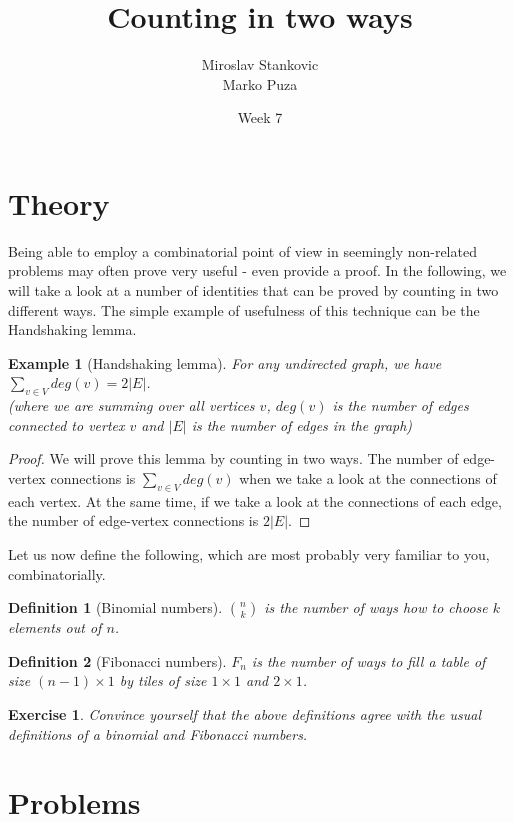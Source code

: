 \documentclass{article}
\title{\textbf{Counting in two ways}}
\date{Week 7}
\author{Miroslav Stankovic \\ Marko Puza}
\newtheorem{definition}{Definition}
\newtheorem{exercise}{Exercise}
\newtheorem{example}{Example}
\begin{document}
\maketitle


\section{Theory}
Being able to employ a combinatorial point of view in seemingly non-related problems may often prove very useful - even provide a proof. In the following, we will take a look at a number of identities that can be proved by counting in two different ways. The simple example of usefulness of this technique can be the Handshaking lemma.

\begin{example}[Handshaking lemma]
For any undirected graph, we have $\sum_{v \in V} deg(v) = 2|E|$. \\ (where we are summing over all vertices $v$, $deg(v)$ is the number of edges connected to vertex $v$ and $|E|$ is the number of edges in the graph)
\end{example}
\begin{proof}
We will prove this lemma by counting in two ways. The number of edge-vertex connections is $\sum_{v \in V}deg(v)$ when we take a look at the connections of each vertex. At the same time, if we take a look at the connections of each edge, the number of edge-vertex connections is $2|E|$.
\end{proof}

\noindent Let us now define the following, which are most probably very familiar to you, combinatorially.

\begin{definition}[Binomial numbers] ${n}\choose{k}$ is the number of ways how to choose $k$ elements out of $n$.
\end{definition}

\begin{definition}[Fibonacci numbers] $F_n$ is the number of ways to fill a table of size $(n - 1) \times 1$ by tiles of size $1 \times 1$ and $2 \times 1$.
\end{definition}

\begin{exercise}
Convince yourself that the above definitions agree with the usual definitions of a binomial and Fibonacci numbers.
\end{exercise}

\section{Problems}
\end{document}
